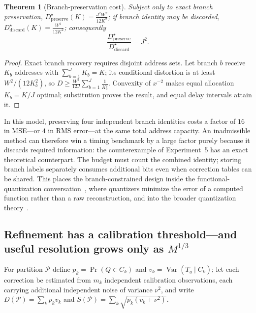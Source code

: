 \documentclass[11pt]{article}
\newtheorem{theorem}{Theorem}
\begin{document}
\begin{theorem}[Branch-preservation cost]\label{thm:branchcost}
Subject only to exact branch preservation,
$D^\star_{\mathrm{preserve}}(K) = \frac{J^2 W^2}{12 K^2}$; if branch identity may be
discarded, $D^\star_{\mathrm{discard}}(K) = \frac{W^2}{12K^2}$; consequently
\begin{equation}
\boxed{\frac{D^\star_{\mathrm{preserve}}}{D^\star_{\mathrm{discard}}} = J^2.}
\end{equation}
\end{theorem}
\begin{proof}
Exact branch recovery requires disjoint address sets. Let branch $b$ receive $K_b$
addresses with $\sum_{b=1}^J K_b = K$; its conditional distortion is at least
$W^2/(12K_b^2)$, so
$D \ge \frac{W^2}{12J}\sum_{b=1}^J \frac{1}{K_b^2}$. Convexity of $x^{-2}$ makes equal
allocation $K_b = K/J$ optimal; substitution proves the result, and equal delay
intervals attain it.
\end{proof}

In this model, preserving four independent branch identities costs a factor of $16$ in
MSE---or $4$ in RMS error---at the same total address capacity. An inadmissible method
can therefore win a timing benchmark by a large factor purely because it discards
required information: the counterexample of Experiment~5 has an exact theoretical
counterpart. The budget must count the combined identity; storing branch labels
separately consumes additional bits even when correction tables can be shared. This
places the branch-constrained design inside the functional-quantization
conversation~\cite{misra2011}, where quantizers minimize the error of a computed
function rather than a raw reconstruction, and into the broader quantization
theory~\cite{shannon1959,gray1998}.

\subsection{Refinement has a calibration threshold---and useful resolution grows only as \texorpdfstring{$M^{1/3}$}{M\^{}(1/3)}}

For partition $\mathcal{P}$ define
$p_k = \Pr(Q \in C_k)$ and $v_k = \operatorname{Var}(T_g \mid C_k)$; let each correction
be estimated from $m_k$ independent calibration observations, each carrying additional
independent noise of variance $\nu^2$, and write
$D(\mathcal{P}) = \sum_k p_k v_k$ and
$S(\mathcal{P}) = \sum_k \sqrt{p_k(v_k + \nu^2)}$.
\end{document}
